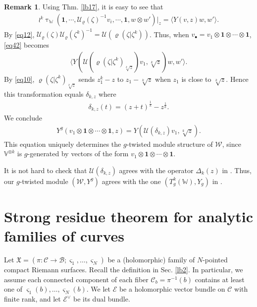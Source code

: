 \documentclass[12pt,a4paper,notitlepage]{article}
\theoremstyle{definition}
\newtheorem{rem}[df]{Remark}
\theoremstyle{plain}
\newcommand{\fk}{\mathfrak}
\newcommand{\mc}{\mathcal}
\newcommand{\id}{\mathbf{1}}
\newcommand{\bk}[1]{\langle {#1}\rangle}
\newcommand{\scr}{\mathscr}
\newcommand{\sgm}{\varsigma}
\newcommand{\blt}{\bullet}
\newcommand{\Vbb}{\mathbb V}
\newcommand{\Wbb}{\mathbb W}
\numberwithin{equation}{section}
\begin{document}
\begin{rem}
Using Thm. \ref{lb17}, it is easy to see that
\begin{align*}
\wr^k\uptau_\Wbb(\id,\cdots,\mc U_\varrho(\zeta)^{-1}v_i,\cdots,\id,w\otimes w')|_z=\bk{Y(v,z)w,w'}.
\end{align*}
By \eqref{eq12}, $\mc U_\varrho(\zeta)\mc U_\varrho(\zeta^k)^{-1}=\mc U(\varrho(\zeta|\zeta^k))$. Thus, when $v_\blt=v_1\otimes\id\otimes\cdots\otimes\id$, \eqref{eq42} becomes
\begin{align*}
\bk{Y(\mc U(\varrho(\zeta|\zeta^k)_{\sqrt[k]z})v_1,\sqrt[k]z)w,w'}.	
\end{align*}
By \eqref{eq10}, $\varrho(\zeta|\zeta^k)_{\sqrt[k]z}$ sends $z_1^k-z$ to $z_1-\sqrt[k]z$ when $z_1$ is close to $\sqrt[k]z$. Hence this transformation equals $\delta_{k,z}$ where 
\begin{align*}
\delta_{k,z}(t)=(z+t)^{\frac 1k}-z^{\frac 1k}.	
\end{align*}
We conclude
\begin{align}
Y^g(v_1\otimes\id\otimes\cdots\otimes \id,z)=Y(\mc U(\delta_{k,z})v_1,\sqrt[k]z).	
\end{align}
This equation uniquely determines the $g$-twisted module structure of $\mc W$, since $\Vbb^{\otimes k}$ is $g$-generated by vectors of the form $v_1\otimes\id\otimes\cdots\otimes \id$.

It is not hard to check that $\mc U(\delta_{k,z})$ agrees with the operator $\Delta_k(z)$ in \cite{BDM02}. Thus, our $g$-twisted module $(\mc W,Y^g)$ agrees with the one $(T^k_g(\Wbb),Y_g)$ in \cite[Thm. 3.9]{BDM02}.
\end{rem}



\appendix


\section{Strong residue theorem for analytic families of curves}\label{lb6}


Let $\fk X=(\pi:\mc C\rightarrow\mc B;\sgm_1,\dots,\sgm_N)$ be a (holomorphic) family of $N$-pointed compact Riemann surfaces. Recall the definition in Sec. \ref{lb2}. In particular, we assume each connected component of each fiber $\mc C_b=\pi^{-1}(b)$ contains at least one of $\sgm_1(b),\dots,\sgm_N(b)$. We let $\scr E$ be a holomorphic vector bundle on $\mc C$ with finite rank, and let $\scr E^\vee$ be its dual bundle.
\end{document}
